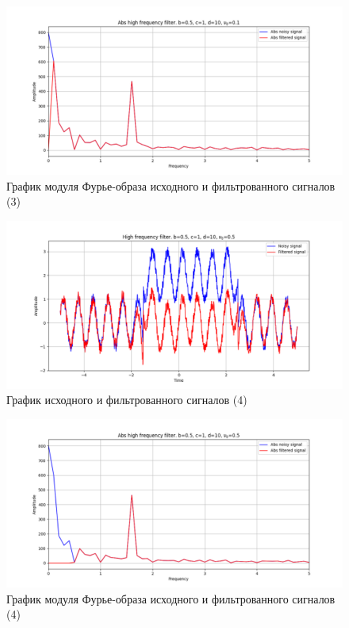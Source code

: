 \documentclass[a4paper, 12pt]{article}
\begin{document}
    \begin{figure}[H]
        \centering
        \includegraphics[scale=0.48]{3_abs_nolow.png}
        \captionsetup{skip=0pt}
        \caption{График модуля Фурье-образа исходного и фильтрованного сигналов (3)}
        \label{fig:fig32}
    \end{figure}
    \begin{figure}[H]
        \centering
        \includegraphics[scale=0.48]{4_nolow.png}
        \captionsetup{skip=0pt}
        \caption{График исходного и фильтрованного сигналов (4)}
        \label{fig:fig33}
    \end{figure}
    \begin{figure}[H]
        \centering
        \includegraphics[scale=0.48]{4_abs_nolow.png}
        \captionsetup{skip=0pt}
        \caption{График модуля Фурье-образа исходного и фильтрованного сигналов (4)}
        \label{fig:fig34}
    \end{figure}
    
\end{document}
